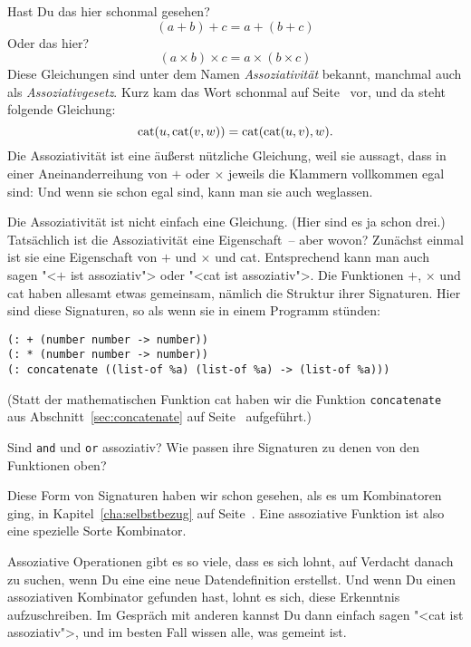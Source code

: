 Hast Du das hier schonmal gesehen?
%
\begin{displaymath}
  (a + b) + c = a + (b + c)
\end{displaymath}
%
Oder das hier?
%
\begin{displaymath}
  (a \times b) \times c = a \times (b \times c)
\end{displaymath}
%
Diese Gleichungen sind unter dem Namen
\textit{Assoziativität} bekannt, manchmal auch
als \textit{Assoziativgesetz}.  Kurz kam das Wort schonmal auf
Seite~\pageref{page:assoziativitaet} vor, und da steht folgende Gleichung:
%
\begin{displaymath}
  {\rm cat}(u,{\rm cat}(v,w))  = {\rm cat}({\rm cat}(u,v),w).
\end{displaymath}
%
Die Assoziativität ist eine äußerst nützliche Gleichung, weil sie
aussagt, dass in einer Aneinanderreihung von $+$ oder $\times$ jeweils
die Klammern vollkommen egal sind: Und wenn sie schon egal sind, kann
man sie auch weglassen.

Die Assoziativität ist nicht einfach eine Gleichung.  (Hier sind es ja
schon drei.)  Tatsächlich ist die Assoziativität eine Eigenschaft~--
aber wovon?  Zunächst einmal ist sie eine Eigenschaft von $+$ und
$\times$ und cat.  Entsprechend kann man auch sagen "<$+$ ist
assoziativ"> oder "<cat ist assoziativ">.  Die Funktionen $+$,
$\times$ und cat haben allesamt etwas gemeinsam, nämlich die Struktur
ihrer Signaturen.  Hier sind diese Signaturen, so als wenn sie in
einem Programm stünden:
%
\begin{lstlisting}
(: + (number number -> number))
(: * (number number -> number))
(: concatenate ((list-of %a) (list-of %a) -> (list-of %a)))
\end{lstlisting}
%
(Statt der mathematischen Funktion cat haben wir die Funktion
\lstinline{concatenate} aus Abschnitt~\ref{sec:concatenate} auf
Seite~\pageref{sec:concatenate} aufgeführt.)
%
\begin{aufgabeinline}
  Sind \lstinline{and} und \lstinline{or} assoziativ?  Wie passen ihre
  Signaturen zu denen von den Funktionen oben?
\end{aufgabeinline}
%
Diese Form von Signaturen haben wir schon gesehen, als es um
Kombinatoren ging, in Kapitel~\ref{cha:selbstbezug} auf
Seite~\pageref{cha:selbstbezug}.  Eine assoziative Funktion ist also
eine spezielle Sorte Kombinator.

Assoziative Operationen gibt es so viele, dass es sich lohnt, auf
Verdacht danach zu suchen, wenn Du eine eine neue Datendefinition
erstellst.  Und wenn Du einen assoziativen Kombinator gefunden hast,
lohnt es sich, diese Erkenntnis aufzuschreiben.  Im Gespräch mit
anderen kannst Du dann einfach sagen "<cat ist assoziativ">, und im
besten Fall wissen alle, was gemeint ist.


